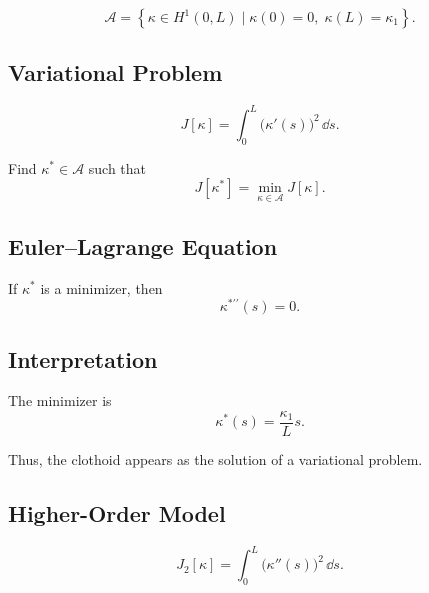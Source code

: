 \begin{definition}
\[
\mathcal{A}
=
\left\{
\kappa \in H^1(0,L)
\mid
\kappa(0)=0,\;
\kappa(L)=\kappa_1
\right\}.
\]
\end{definition}

\subsection{Variational Problem}

\begin{definition}
\[
J[\kappa]
=
\int_0^L \bigl(\kappa'(s)\bigr)^2 \, \dd s .
\]
\end{definition}

\begin{definition}
Find $\kappa^\ast \in \mathcal{A}$ such that
\[
J[\kappa^\ast]
=
\min_{\kappa \in \mathcal{A}} J[\kappa].
\]
\end{definition}

\subsection{Euler--Lagrange Equation}

\begin{proposition}
If \(\kappa^\ast\) is a minimizer, then
\[
\kappa^{\ast\prime\prime}(s)=0.
\]
\end{proposition}

\subsection{Interpretation}

\begin{proposition}
The minimizer is
\[
\kappa^\ast(s)=\frac{\kappa_1}{L}s .
\]
\end{proposition}

\begin{remark}
Thus, the clothoid appears as the solution of a variational problem.
\end{remark}

\subsection{Higher-Order Model}

\begin{definition}
\[
J_2[\kappa]
=
\int_0^L \bigl(\kappa''(s)\bigr)^2 \,\dd s.
\]
\end{definition}

